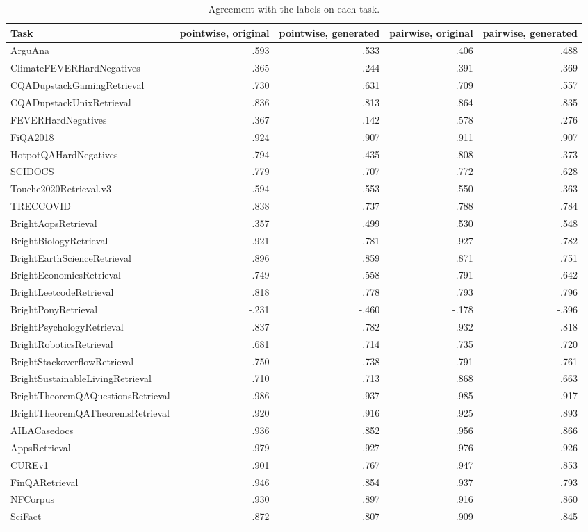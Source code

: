 \begin{table}[t]
\centering\small
\setlength{\tabcolsep}{5pt}
\begin{tabular}{lrrrr}
\toprule
\textbf{Task} & \textbf{pointwise, original} & \textbf{pointwise, generated} & \textbf{pairwise, original} & \textbf{pairwise, generated} \\
\midrule
ArguAna & .593 & .533 & .406 & .488 \\
ClimateFEVERHardNegatives & .365 & .244 & .391 & .369 \\
CQADupstackGamingRetrieval & .730 & .631 & .709 & .557 \\
CQADupstackUnixRetrieval & .836 & .813 & .864 & .835 \\
FEVERHardNegatives & .367 & .142 & .578 & .276 \\
FiQA2018 & .924 & .907 & .911 & .907 \\
HotpotQAHardNegatives & .794 & .435 & .808 & .373 \\
SCIDOCS & .779 & .707 & .772 & .628 \\
Touche2020Retrieval.v3 & .594 & .553 & .550 & .363 \\
TRECCOVID & .838 & .737 & .788 & .784 \\
BrightAopsRetrieval & .357 & .499 & .530 & .548 \\
BrightBiologyRetrieval & .921 & .781 & .927 & .782 \\
BrightEarthScienceRetrieval & .896 & .859 & .871 & .751 \\
BrightEconomicsRetrieval & .749 & .558 & .791 & .642 \\
BrightLeetcodeRetrieval & .818 & .778 & .793 & .796 \\
BrightPonyRetrieval & -.231 & -.460 & -.178 & -.396 \\
BrightPsychologyRetrieval & .837 & .782 & .932 & .818 \\
BrightRoboticsRetrieval & .681 & .714 & .735 & .720 \\
BrightStackoverflowRetrieval & .750 & .738 & .791 & .761 \\
BrightSustainableLivingRetrieval & .710 & .713 & .868 & .663 \\
BrightTheoremQAQuestionsRetrieval & .986 & .937 & .985 & .917 \\
BrightTheoremQATheoremsRetrieval & .920 & .916 & .925 & .893 \\
AILACasedocs & .936 & .852 & .956 & .866 \\
AppsRetrieval & .979 & .927 & .976 & .926 \\
CUREv1 & .901 & .767 & .947 & .853 \\
FinQARetrieval & .946 & .854 & .937 & .793 \\
NFCorpus & .930 & .897 & .916 & .860 \\
SciFact & .872 & .807 & .909 & .845 \\
\bottomrule
\end{tabular}
\caption{Agreement with the labels on each task.}
\label{tab:main_table_per_task}
\end{table}

